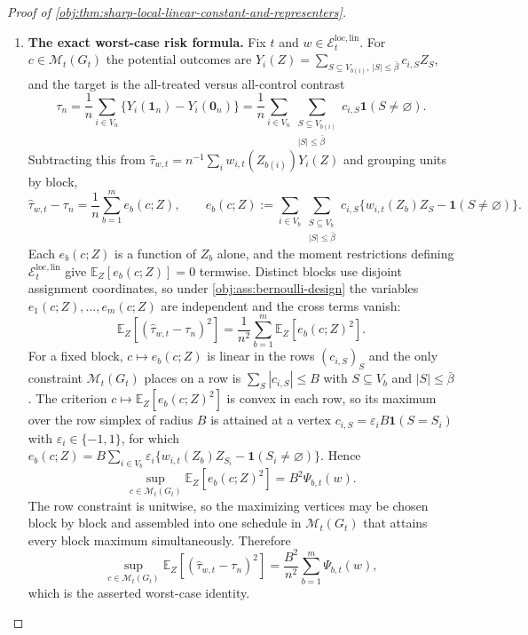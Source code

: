 \documentclass[11pt]{article}
\begin{document}
\begin{proof}[Proof of \cref{obj:thm:sharp-local-linear-constant-and-representers}]
\begin{enumerate}
\item \textbf{The exact worst-case risk formula.}  Fix \(t\) and \(w\in\mathcal E_t^{\mathrm{loc,lin}}\).  For \(c\in\mathcal M_t(G_t)\) the potential outcomes are \(Y_i(Z)=\sum_{S\subseteq V_{b(i)},\,|S|\le\bar\beta}c_{i,S}Z_S\), and the target is the all-treated versus all-control contrast
\[
\tau_{n}
=
\frac1n\sum_{i\in V_{n}}\{Y_i(\mathbf 1_{n})-Y_i(\mathbf 0_{n})\}
=
\frac1n\sum_{i\in V_{n}}
\sum_{\substack{S\subseteq V_{b(i)}\\ |S|\le\bar\beta}}
c_{i,S}\mathbf 1(S\ne\varnothing).
\]
Subtracting this from \(\widehat\tau_{w,t}=n^{-1}\sum_i w_{i,t}(Z_{b(i)})Y_i(Z)\) and grouping units by block,
\[
\widehat\tau_{w,t}-\tau_{n}
=
\frac1n\sum_{b=1}^{m}e_{b}(c;Z),
\qquad
e_{b}(c;Z)
:=
\sum_{i\in V_b}
\sum_{\substack{S\subseteq V_b\\ |S|\le\bar\beta}}
c_{i,S}\bigl\{w_{i,t}(Z_b)Z_S-\mathbf 1(S\ne\varnothing)\bigr\}.
\]
Each \(e_{b}(c;Z)\) is a function of \(Z_b\) alone, and the moment restrictions defining \(\mathcal E_t^{\mathrm{loc,lin}}\) give \(\mathbb E_Z[e_{b}(c;Z)]=0\) termwise.  Distinct blocks use disjoint assignment coordinates, so under \cref{obj:ass:bernoulli-design} the variables \(e_1(c;Z),\ldots,e_{m}(c;Z)\) are independent and the cross terms vanish:
\[
\mathbb E_Z\!\left[(\widehat\tau_{w,t}-\tau_{n})^2\right]
=
\frac{1}{n^2}\sum_{b=1}^{m}\mathbb E_Z\!\left[e_{b}(c;Z)^2\right].
\]
For a fixed block, \(c\mapsto e_{b}(c;Z)\) is linear in the rows \((c_{i,S})_{S}\) and the only constraint \(\mathcal M_t(G_t)\) places on a row is \(\sum_{S}|c_{i,S}|\le B\) with \(S\subseteq V_b\) and \(|S|\le\bar\beta\).  The criterion \(c\mapsto\mathbb E_Z[e_{b}(c;Z)^2]\) is convex in each row, so its maximum over the row simplex of radius \(B\) is attained at a vertex \(c_{i,S}=\varepsilon_iB\mathbf 1(S=S_i)\) with \(\varepsilon_i\in\{-1,1\}\), for which \(e_{b}(c;Z)=B\sum_{i\in V_b}\varepsilon_i\{w_{i,t}(Z_b)Z_{S_i}-\mathbf 1(S_i\ne\varnothing)\}\).  Hence
\[
\sup_{c\in\mathcal M_t(G_t)}\mathbb E_Z\!\left[e_{b}(c;Z)^2\right]
=
B^2\Psi_{b,t}(w).
\]
The row constraint is unitwise, so the maximizing vertices may be chosen block by block and assembled into one schedule in \(\mathcal M_t(G_t)\) that attains every block maximum simultaneously.  Therefore
\[
\sup_{c\in\mathcal M_t(G_t)}
\mathbb E_Z\!\left[(\widehat\tau_{w,t}-\tau_{n})^2\right]
=
\frac{B^2}{n^2}\sum_{b=1}^{m}\Psi_{b,t}(w),
\]
which is the asserted worst-case identity. %


\end{enumerate}
\end{proof}
\end{document}
